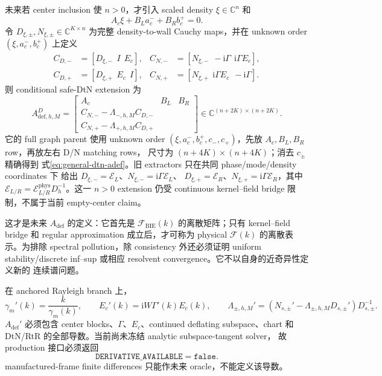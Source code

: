 \documentclass[UTF8,fontset=fandol,11pt,a4paper]{ctexart}
\newcommand{\ii}{\mathrm{i}}
\newcommand{\cF}{\mathcal F}
\begin{document}
未来若 center inclusion 使 $n>0$，才引入 scaled density $\xi\in\mathbb C^n$ 和
\[
  A_c\xi+B_La_c^-+B_Rb_c^+=0.
\]
令 $D_{\xi,\pm},N_{\xi,\pm}\in\mathbb C^{K\times n}$ 为完整
density-to-wall Cauchy maps，并在 unknown order $(\xi,a_c^-,b_c^+)$ 上定义
\[
\begin{aligned}
 C_{D,-}&=[D_{\xi,-}\ \ I\ \ E_c],&
 C_{N,-}&=[N_{\xi,-}\ \ -\ii\Gamma\ \ \ii\Gamma E_c],\\
 C_{D,+}&=[D_{\xi,+}\ \ E_c\ \ I],&
 C_{N,+}&=[N_{\xi,+}\ \ \ii\Gamma E_c\ \ -\ii\Gamma].
\end{aligned}
\]
则 conditional safe-DtN extension 为
\begin{equation}
  A_{\mathrm{def},h,M}^{D}=
  \begin{bmatrix}
    A_c&B_L&B_R\\
    C_{N,-}-\Lambda_{-,h,M}C_{D,-}\\
    C_{N,+}-\Lambda_{+,h,M}C_{D,+}
  \end{bmatrix}
  \in\mathbb C^{(n+2K)\times(n+2K)}.
  \label{eq:general-dtn-adef}
\end{equation}
它的 full graph parent 使用 unknown order
$(\xi,a_c^-,b_c^+,c_-,c_+)$，先放 $A_c,B_L,B_R$ row，再放左右 D/N matching rows，
尺寸为 $(n+4K)\times(n+4K)$；消去 $c_\pm$ 精确得到
式\eqref{eq:general-dtn-adef}。旧 extractors 只在共同 phase/mode/density coordinates 下
给出
$D_{\xi,-}=\mathcal E_L$、$N_{\xi,-}=\ii\Gamma\mathcal E_L$、
$D_{\xi,+}=\mathcal E_R$、$N_{\xi,+}=\ii\Gamma\mathcal E_R$，其中
$\mathcal E_{L/R}=\mathcal E_{L/R}^{\mathrm{phys}}D_h^{-1}$。这一 $n>0$ extension
仍受 continuous kernel--field bridge 限制，不属于当前 empty-center claim。

这才是未来 $A_{\mathrm{def}}$ 的定义：它首先是 $\cF_{\mathrm{BIE}}(k)$ 的离散矩阵；只有
kernel--field bridge 和 regular approximation 成立后，才可称为 physical
$\cF(k)$ 的离散表示。为排除 spectral pollution，除 consistency 外还必须证明 uniform
stability/discrete inf--sup 或相应 resolvent convergence。它不以自身的近奇异性定义新的
连续谱问题。

在 anchored Rayleigh branch 上，
\[
  \gamma_m'(k)=\frac{k}{\gamma_m(k)},
  \qquad E_c'(k)=\ii W\Gamma'(k)E_c(k),
  \qquad
  \Lambda_{\pm,h,M}'
  =(N_{s,\pm}'-\Lambda_{\pm,h,M}D_{s,\pm}')D_{s,\pm}^{-1}.
\]
$A_{\mathrm{def}}'$ 必须包含 center blocks、$\Gamma$、$E_c$、continued deflating
subspace、chart 和 DtN/RtR 的全部导数。当前尚未冻结 analytic subspace-tangent solver，
故 production 接口必须返回
\[
  \texttt{DERIVATIVE\_AVAILABLE}=\texttt{false}.
\]
manufactured-frame finite differences 只能作未来 oracle，不能定义该导数。
\end{document}
